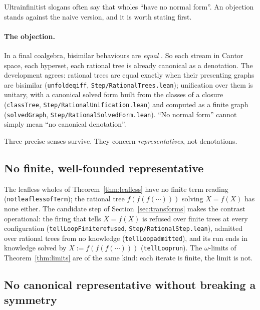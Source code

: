 \documentclass[]{article}
\theoremstyle{definition}
\theoremstyle{remark}
\newcommand{\codeus}{\textunderscore\allowbreak}
\newcommand{\code}[1]{\texttt{\let\_\codeus #1}}
\newcommand{\lpath}[1]{{\ttfamily\nolinkurl{#1}}}
\newcommand{\step}[1]{\lpath{Step/#1.lean}}
\begin{document}
Ultrainfinitist slogans often say that wholes ``have no normal form''. An objection stands against
the naive version, and it is worth stating first.

\paragraph{The objection.} In a final coalgebra, bisimilar behaviours are \emph{equal}
\cite{Rutten2000, AczelAFA}. So each stream in Cantor space, each hyperset, each rational tree is
already canonical as a denotation. The development agrees: rational trees are equal exactly when
their presenting graphs are bisimilar (\code{unfold\_eq\_iff}, \step{RationalTrees}); unification over
them is unitary, with a canonical solved form built from the classes of a closure
(\code{classTree}, \step{RationalUnification}) and computed as a finite graph (\code{solvedGraph},
\step{RationalSolvedForm}). ``No normal form'' cannot simply mean ``no canonical denotation''.

Three precise senses survive. They concern \emph{representatives}, not denotations.

\subsection{No finite, well-founded representative}
\label{sec:nf-finite}

The leafless wholes of Theorem~\ref{thm:leafless} have no finite term reading
(\code{not\_leafless\_ofTerm}); the rational tree $f(f(f(\cdots)))$ solving $X=f(X)$ has none either.
The candidate step of Section~\ref{sec:transforms} makes the contrast operational: the firing that
tells $X=f(X)$ is refused over finite trees at every configuration (\code{tellLoopFinite\_refused},
\step{RationalStep}), admitted over rational trees from no knowledge (\code{tellLoop\_admitted}), and
its run ends in knowledge solved by $X:=f(f(f(\cdots)))$ (\code{tellLoop\_run}). The $\omega$-limits of
Theorem~\ref{thm:limits} are of the same kind: each iterate is finite, the limit is not.

\subsection{No canonical representative without breaking a symmetry}
\label{sec:nf-symmetry}
\end{document}
